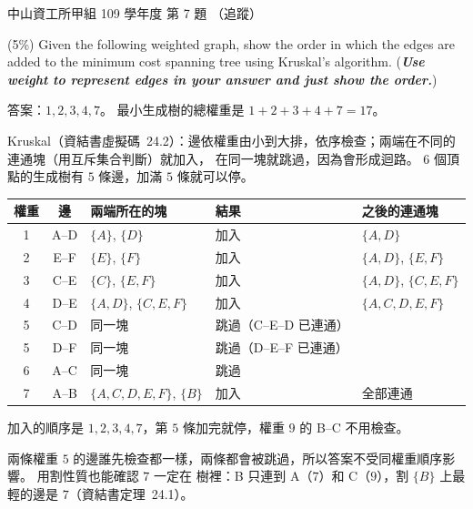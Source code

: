 \begin{pastexam}[label={px:nsysu-109-osds-01}]{中山資工所甲組 109 學年度 第 7 題}
（追蹤）

(5\%) Given the following weighted graph, show the order in which the edges are added to the
minimum cost spanning tree using Kruskal's algorithm. (\textbf{\textit{Use weight to represent edges
in your answer and just show the order.}})

\begin{center}
\end{center}
\end{pastexam}

\begin{pastsoln}
答案：$1, 2, 3, 4, 7$。 最小生成樹的總權重是 $1 + 2 + 3 + 4 + 7 = 17$。

Kruskal（資結書虛擬碼~24.2）：邊依權重由小到大排，依序檢查；兩端在不同的連通塊（用互斥集合判斷）就加入，
在同一塊就跳過，因為會形成迴路。 $6$ 個頂點的生成樹有 $5$ 條邊，加滿 $5$ 條就可以停。
\begin{center}
\begin{tabular}{cclll}
\toprule
權重 & 邊 & 兩端所在的塊 & 結果 & 之後的連通塊 \\
\midrule
1 & A--D & $\{A\}$, $\{D\}$ & 加入 & $\{A, D\}$ \\
2 & E--F & $\{E\}$, $\{F\}$ & 加入 & $\{A, D\}$, $\{E, F\}$ \\
3 & C--E & $\{C\}$, $\{E, F\}$ & 加入 & $\{A, D\}$, $\{C, E, F\}$ \\
4 & D--E & $\{A, D\}$, $\{C, E, F\}$ & 加入 & $\{A, C, D, E, F\}$ \\
5 & C--D & 同一塊 & 跳過（C--E--D 已連通） & \\
5 & D--F & 同一塊 & 跳過（D--E--F 已連通） & \\
6 & A--C & 同一塊 & 跳過 & \\
7 & A--B & $\{A, C, D, E, F\}$, $\{B\}$ & 加入 & 全部連通 \\
\bottomrule
\end{tabular}
\end{center}
加入的順序是 $1, 2, 3, 4, 7$，第 $5$ 條加完就停，權重 $9$ 的 B--C 不用檢查。

兩條權重 $5$ 的邊誰先檢查都一樣，兩條都會被跳過，所以答案不受同權重順序影響。 用割性質也能確認 $7$ 一定在
樹裡：B 只連到 A（$7$）和 C（$9$），割 $\{B\}$ 上最輕的邊是 $7$（資結書定理~24.1）。
\end{pastsoln}
